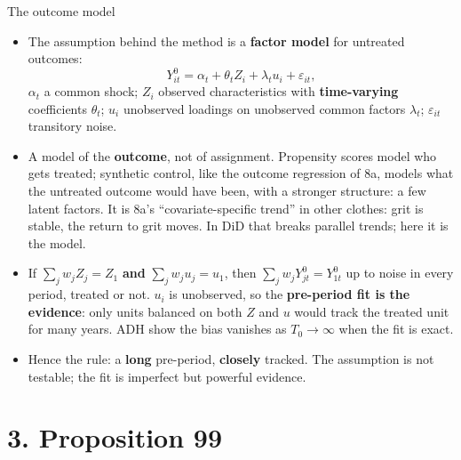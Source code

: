 \documentclass[
  11pt,
  ignorenonframetext,
  aspectratio=169,
]{beamer}
\providecommand{\tightlist}{%
  \setlength{\itemsep}{0pt}\setlength{\parskip}{0pt}}
\begin{document}
\begin{frame}{The outcome model}
\protect{}\label{the-outcome-model}
\begin{itemize}
\tightlist
\item
  The assumption behind the method is a \textbf{factor model} for
  untreated outcomes: \[
  Y^0_{it} = \alpha_t + \theta_t Z_i + \lambda_t u_i + \varepsilon_{it},
  \] \(\alpha_t\) a common shock; \(Z_i\) observed characteristics with
  \textbf{time-varying} coefficients \(\theta_t\); \(u_i\) unobserved
  loadings on unobserved common factors \(\lambda_t\);
  \(\varepsilon_{it}\) transitory noise.
\item
  A model of the \textbf{outcome}, not of assignment. Propensity scores
  model who gets treated; synthetic control, like the outcome regression
  of 8a, models what the untreated outcome would have been, with a
  stronger structure: a few latent factors. It is 8a's
  ``covariate-specific trend'' in other clothes: grit is stable, the
  return to grit moves. In DiD that breaks parallel trends; here it is
  the model.
\item
  If \(\sum_j w_j Z_j = Z_1\) \textbf{and} \(\sum_j w_j u_j = u_1\),
  then \(\sum_j w_j Y^0_{jt} = Y^0_{1t}\) up to noise in every period,
  treated or not. \(u_i\) is unobserved, so the \textbf{pre-period fit
  is the evidence}: only units balanced on both \(Z\) and \(u\) would
  track the treated unit for many years. ADH show the bias vanishes as
  \(T_0 \to \infty\) when the fit is exact.
\item
  Hence the rule: a \textbf{long} pre-period, \textbf{closely} tracked.
  The assumption is not testable; the fit is imperfect but powerful
  evidence.
\end{itemize}
\end{frame}

\section{3. Proposition 99}\label{proposition-99}
\end{document}
